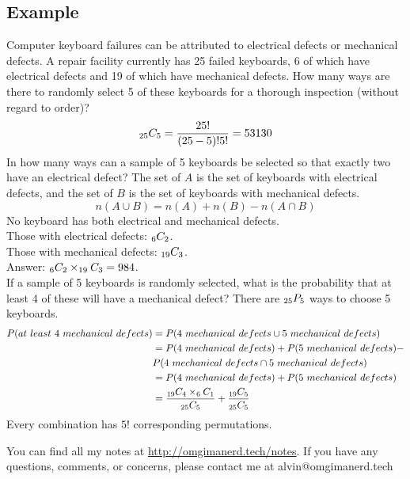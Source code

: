 \documentclass[letterpaper, 12pt]{math}
\begin{document}
\subsection*{Example}
Computer keyboard failures can be attributed to electrical defects or
mechanical defects. A repair facility currently has 25 failed keyboards, 6
of which have electrical defects and 19 of which have mechanical defects.
How many ways are there to randomly select 5 of these keyboards for a thorough
inspection (without regard to order)?
\[ _{25}C_{5} = \frac{25!}{(25-5)!5!} = 53130 \]
In how many ways can a sample of 5 keyboards be selected so that exactly two
have an electrical defect? The set of \( A \) is the set of keyboards with
electrical defects, and the set of \( B \) is the set of keyboards with
mechanical defects.
\[ n(A \cup B) = n(A) + n(B) - n(A \cap B) \]
No keyboard has both electrical and mechanical defects. \\
Those with electrical defects: \( _{6}C_{2} \). \\
Those with mechanical defects: \( _{19}C_{3} \). \\
Answer: \( _{6}C_{2} \times _{19}C_{3} = 984 \). \\
If a sample of 5 keyboards is randomly selected, what is the probability that
at least 4 of these will have a mechanical defect? There are \( _{25}P_{5} \)
ways to choose 5 keyboards. \\
\begin{align*}
  P(at\ least\ 4\ mechanical\ defects) &=
    P(4\ mechanical\ defects \cup 5\ mechanical\ defects) \\
  &= P(4\ mechanical\ defects)+P(5\ mechanical\ defects)- \\
  & P(4\ mechanical\ defects \cap 5\ mechanical\ defects) \\
  &= P(4\ mechanical\ defects)+P(5\ mechanical\ defects) \\
  &= \frac{_{19}C_{4}\times_{6}C_{1}}{_{25}C_{5}}+
    \frac{_{19}C_{5}}{_{25}C_{5}}
\end{align*}
Every combination has \( 5! \) corresponding permutations.

\begin{center}
  You can find all my notes at \url{http://omgimanerd.tech/notes}. If you have
  any questions, comments, or concerns, please contact me at
  alvin@omgimanerd.tech
\end{center}
\end{document}
